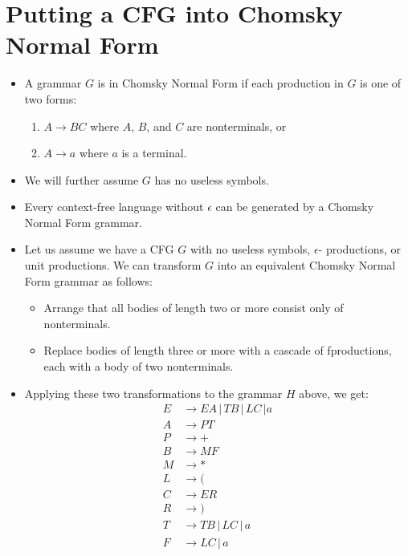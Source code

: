 \documentclass[]{article}
\begin{document}
\section{Putting a CFG into Chomsky Normal Form}
  \begin{itemize}
    \item A grammar $G$ is in Chomsky Normal Form if each production in $G$ is one 
    of two forms:
      \begin{enumerate}
        \item $A \rightarrow BC$ where $A$, $B$, and $C$ are nonterminals, or
        \item $A \rightarrow a$ where $a$ is a terminal.
      \end{enumerate}
    \item We will further assume $G$ has no useless symbols.
    \item Every context-free language without $\epsilon$ can be generated by a 
    Chomsky Normal Form grammar.
    \item Let us assume we have a CFG $G$ with no useless symbols, $\epsilon$-
    productions, or unit productions. We can transform $G$ into an equivalent 
    Chomsky Normal Form grammar as follows:
      \begin{itemize}
        \item Arrange that all bodies of length two or more consist only of 
        nonterminals.
        \item Replace bodies of length three or more with a cascade of 
        fproductions, each with a body of two nonterminals.
      \end{itemize}
    \item Applying these two transformations to the grammar $H$ above, we get:
      \begin{align*}
        E &\rightarrow EA \, | \, TB \, | \, LC \, | a \\
        A &\rightarrow PT                              \\
        P &\rightarrow +                               \\
        B &\rightarrow MF                              \\
        M &\rightarrow *                               \\
        L &\rightarrow (                               \\
        C &\rightarrow ER                              \\
        R &\rightarrow )                               \\
        T &\rightarrow TB \, | \, LC \, | \, a         \\
        F &\rightarrow LC \, | \, a                    \\
      \end{align*}
  \end{itemize}
\end{document}

